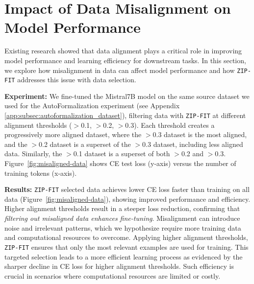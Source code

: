 \section{Impact of Data Misalignment on Model Performance}

Existing research showed that data alignment plays a critical role in improving model performance and learning efficiency for downstream tasks. In this section, we explore how misalignment in data can affect model performance and how \texttt{ZIP-FIT} addresses this issue with data selection.

\textbf{Experiment:} We fine-tuned the Mistral7B model on the same source dataset we used for the AutoFormalization experiment (see Appendix \ref{app:subsec:autoformalization_dataset}), filtering data with \texttt{ZIP-FIT} at different alignment thresholds ($>$0.1, $>$0.2, $>$0.3). 
Each threshold creates a progressively more aligned dataset, where the $>$0.3 dataset is the most aligned, and the $>$0.2 dataset is a superset of the $>$0.3 dataset, including less aligned data. 
Similarly, the $>$0.1 dataset is a superset of both $>$0.2 and $>$0.3.
Figure~\ref{fig:misaligned-data} shows CE test loss (y-axis) versus the number of training tokens (x-axis). 

\textbf{Results:} \texttt{ZIP-FIT} selected data achieves lower CE loss faster than training on all data (Figure~\ref{fig:misaligned-data}), showing improved performance and efficiency. 
Higher alignment thresholds result in a steeper loss reduction, confirming that \textit{filtering out misaligned data enhances fine-tuning}. 
Misalignment can introduce noise and irrelevant patterns, which we hypothesize require more training data and computational resources to overcome. 
Applying higher alignment thresholds, \texttt{ZIP-FIT} ensures that only the most relevant examples are used for training. 
This targeted selection leads to a more efficient learning process as evidenced by the sharper decline in CE loss for higher alignment thresholds. 
Such efficiency is crucial in scenarios where computational resources are limited or costly.


